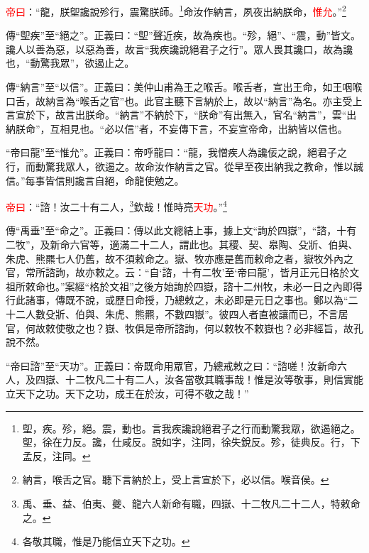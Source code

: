 \textcolor{red}{帝曰}：“龍，朕堲讒說殄行，震驚朕師。\footnote{堲，疾。殄，絕。震，動也。言我疾讒說絕君子之行而動驚我眾，欲遏絕之。堲，徐在力反。讒，仕咸反。說如字，注同，徐失銳反。殄，徒典反。行，下孟反，注同。}命汝作納言，夙夜出納朕命，\textcolor{red}{惟允}。”\footnote{納言，喉舌之官。聽下言納於上，受上言宣於下，必以信。喉音侯。}

{\noindent\zhuan{}\fzbyks 傳“堲疾”至“絕之”。正義曰：“堲”聲近疾，故為疾也。“殄，絕”、“震，動”皆文。讒人以善為惡，以惡為善，故言“我疾讒說絕君子之行”。眾人畏其讒口，故為讒也，“動驚我眾”，欲遏止之。 \par}

{\noindent\zhuan{}\fzbyks 傳“納言”至“以信”。正義曰：美仲山甫為王之喉舌。喉舌者，宣出王命，如王咽喉口舌，故納言為“喉舌之官”也。此官主聽下言納於上，故以“納言”為名。亦主受上言宣於下，故言出朕命。“納言”不納於下，“朕命”有出無入，官名“納言”，雲“出納朕命”，互相見也。“必以信”者，不妄傳下言，不妄宣帝命，出納皆以信也。 \par}

{\noindent\shu{}\fzkt “帝曰龍”至“惟允”。正義曰：帝呼龍曰：“龍，我憎疾人為讒佞之說，絕君子之行，而動驚我眾人，欲遏之。故命汝作納言之官。從早至夜出納我之教命，惟以誠信。”每事皆信則讒言自絕，命龍使勉之。 \par}

\textcolor{red}{帝曰}：“諮！汝二十有二人，\footnote{禹、垂、益、伯夷、夔、龍六人新命有職，四嶽、十二牧凡二十二人，特敕命之。}欽哉！惟時亮\textcolor{red}{天功}。”\footnote{各敬其職，惟是乃能信立天下之功。}

{\noindent\zhuan{}\fzbyks 傳“禹垂”至“命之”。正義曰：傳以此文總結上事，據上文“詢於四嶽”，“諮，十有二牧”，及新命六官等，適滿二十二人，謂此也。其稷、契、皋陶、殳斨、伯與、朱虎、熊羆七人仍舊，故不須敕命之。嶽、牧亦應是舊而敕命之者，嶽牧外內之官，常所諮詢，故亦敕之。云：“自‘諮，十有二牧’至‘帝曰龍’，皆月正元日格於文祖所敕命也。”案經“格於文祖”之後方始詢於四嶽，諮十二州牧，未必一日之內即得行此諸事，傳既不說，或歷日命授，乃總敕之，未必即是元日之事也。鄭以為“二十二人數殳斨、伯與、朱虎、熊羆，不數四嶽”。彼四人者直被讓而已，不言居官，何故敕使敬之也？嶽、牧俱是帝所諮詢，何以敕牧不敕嶽也？必非經旨，故孔說不然。 \par}

{\noindent\shu{}\fzkt “帝曰諮”至“天功”。正義曰：帝既命用眾官，乃總戒敕之曰：“諮嗟！汝新命六人，及四嶽、十二牧凡二十有二人，汝各當敬其職事哉！惟是汝等敬事，則信實能立天下之功。天下之功，成王在於汝，可得不敬之哉！” \par}


